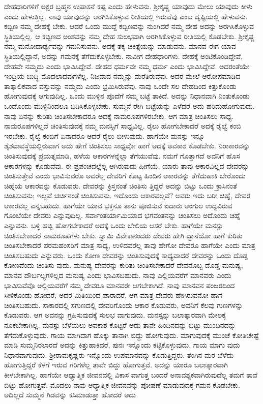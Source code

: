 ದೇಹಧಾರಿಗಳಿಗೆ ಅಕ್ಷರ ಬ್ರಹ್ಮನ ಉಪಾಸನೆ ಕಷ್ಟ ಎಂದು ಹೇಳುವನು. ಶ‍್ರೀಕೃಷ್ಣ ಯಾವುದು ಮೇಲು ಯಾವುದು ಕೀಳು ಎಂದು ಹೇಳುತ್ತಿಲ್ಲ. ನಾವು ಯಾವುದನ್ನು ಅರಗಿಸಿಕೊಳ್ಳುವ ರೀತಿಯಲ್ಲಿ ಇರುವೆವು ಎಂಬ ದೃಷ್ಟಿಯಲ್ಲಿ ಹೇಳುವನು. ಕಬ್ಬಿಣ ನಮ್ಮ ದೇಹಕ್ಕೆ ಬೇಕು. ಆದರೆ ಒಂದು ಮುದ್ದೆ ಕಬ್ಬಿಣವನ್ನು ನುಂಗಿದರೆ ನಮ್ಮ ದೇಹ ಅದನ್ನು ಅರಗಿಸಿಕೊಳ್ಳುವ ಸ್ಥಿತಿಯಲ್ಲಿಲ್ಲ. ಆ ಕಬ್ಬಿಣದ ಅಂಶವನ್ನು ನಮ್ಮ ದೇಹ ಸುಲಭವಾಗಿ ಅರಗಿಸಿಕೊಳ್ಳುವ ರೀತಿಯಲ್ಲಿ ಕೊಡಬೇಕು. ಶ‍್ರೀಕೃಷ್ಣ ನಮ್ಮ ಮನೋದಾರ್ಢ್ಯವನ್ನು ಗಮನಿಸುವನು. ಅದಕ್ಕೆ ತಕ್ಕ ಚಿಕಿತ್ಸೆಯನ್ನು ಮಾಡುವನು. ಮಾನವ ಈಗ ಯಾವ ಸ್ಥಿತಿಯಲ್ಲಿದ್ದಾನೆ, ಅದನ್ನು ಗಮನಕ್ಕೆ ತೆಗೆದುಕೊಳ್ಳಬೇಕು. ನಾವೀಗ ದೇಹಧಾರಿಗಳು. ದೇಹಕ್ಕೆ ಅಂಟಿಕೊಂಡಿದ್ದೇವೆ, ದೇಹವೇ ನಮ್ಮದು ಎಂದು ಭಾವಿಸಿದ್ದೇವೆ. ದೇಹದ ಧರ್ಮವೇ ನಮ್ಮ ಧರ್ಮ ಎಂದು ಭಾವಿಸಿದ್ದೇವೆ. ಅದರಂತೆಯೇ ಇಂದ್ರಿಯ ಬುದ್ಧಿ ಮೊದಲಾದವುಗಳೆಲ್ಲ. ನಿಜವಾದ ನಮ್ಮನ್ನು ಮರೆತಿರುವೆವು. ಅದರ ಮೇಲೆ ಆರೋಪಮಾಡಿದ ತಾತ್ಕಾಲಿಕವಾದ ವಸ್ತುವನ್ನು ನಮ್ಮದು ಎಂದು ಭ್ರಮಿಸಿರುವೆವು. ನಾವು ಒಂದೇ ಸಲ ದೇಹದಿಂದ ಕಿತ್ತುಕೊಂಡು ಹೋಗುವುದಕ್ಕೆ ಆಗುವುದಿಲ್ಲ. ಒಂದು ಮುಳ್ಳಿನ ಪೊದೆಗೆ ನಮ್ಮ ಬಟ್ಟೆ ತಾಕಿದೆ. ಅದನ್ನು ನಿಧಾನವಾಗಿ ನಿಂತುಕೊಂಡು ಒಂದೊಂದು ಮುಳ್ಳಿನಿಂದಲೂ ಬಿಡಿಸಿಕೊಳ್ಳಬೇಕು. ಸುಮ್ಮನೆ ರೇಗಿ ಬಟ್ಟೆಯನ್ನು ಎಳೆದರೆ ಅದು ಹರಿದುಹೋಗುವುದು. ನಾವು ಏನನ್ನು ಕುರಿತು ಚಿಂತಿಸಬೇಕಾದರೂ ಅದಕ್ಕೆ ನಾಮರೂಪಗಳಿರಬೇಕು. ಆಗ ಮಾತ್ರ ಚಿಂತಿಸಲು ಸಾಧ್ಯ. ನಾಮರೂಪಗಳಿಲ್ಲದೆ ಚಿಂತಿಸುವುದಕ್ಕೆ ನಮ್ಮ ಮನಸ್ಸಿಗೆ ಸಾಧ್ಯವಿಲ್ಲ. ರೈಲು ಹೋಗಬೇಕಾದರೆ ಅದಕ್ಕೆ ರೈಲ್ವೆ ಕಂಬಿ ಇರಬೇಕು. ರೈಲ್ವೆ ಕಂಬಿಗೆ ಏನಾದರೂ ಆದರೆ ರೈಲು ಬೀಳುವುದು. ಹಾಗೆಯೇ ಮನಸ್ಸು ಇನ್ನೂ ಶೈಶವಾವಸ್ಥೆಯಲ್ಲಿರುವಾಗ ಅದು ಹೇಗೆ ಚಿಂತಿಸಲು ಸಾಧ್ಯವೋ ಹಾಗೆ ಅದಕ್ಕೆ ಅವಕಾಶ ಕೊಡಬೇಕು. ನಿರಾಕಾರವನ್ನು ಚಿಂತಿಸುವುದಕ್ಕೆ ಪ್ರಯತ್ನಮಾಡಿ, ಹಳೆಯ ಆಕಾರಗಳನ್ನೆಲ್ಲಾ ತೆಗೆಯುವೆವು. ನಮಗೆ ಗೊತ್ತಾಗದೆ ಅವನಿಗೆ ಹೊಸ ಆಕಾರಗಳನ್ನು ಕೊಡುವೆವು. ಈ ಪ್ರಪಂಚದಲ್ಲೆಲ್ಲ ಆಗಿರುವುದು ಹೀಗೆಯೆ. ಯಾರು ತಾವು ಆಕಾರವಿಲ್ಲದ ದೇವರನ್ನು ಚಿಂತಿಸುತ್ತೇವೆ ಎಂದು ಭಾವಿಸುವರೊ ಅವರೆಲ್ಲ ದೇವರಿಗೆ ಕೊಟ್ಟ ಹಿಂದಿನ ಆಕಾರವನ್ನು ತೆಗೆದುಹಾಕಿ ಬೇರೊಂದು ಚಿಹ್ನೆಯ ಆಕಾರವನ್ನು ಕೊಡುವರು. ದೇವರನ್ನು ಕ್ರಿಸ್ತನಂತೆ ಚಿಂತಿಸು ತ್ತಿದ್ದರೆ ಅದನ್ನು ಬಿಟ್ಟು ಒಂದು ಕ್ರಾಸಿನಂತೆ ಚಿಂತಿಸುವನು; ಇಲ್ಲವೆ ಚರ್ಚಿನಂತೆ ಚಿಂತಿಸುವನು. ಇದೊಂದು ಆಕಾರವಲ್ಲವೆ? ಅವರು ಇದು ಬರೀ ಚಿಹ್ನೆ, ದೇವರ ಆಕಾರವಲ್ಲ ಎನ್ನಬಹುದು. ಹಾಗೆಯೇ ಯಾವ ಭಕ್ತನೂ ತಾನು ಪೂಜಿಸುವ ಐದಾರು ಅಂಗುಲ ಉದ್ದವಿರುವ ಗೊಂಬೆಯೇ ದೇವರು ಎನ್ನುವುದಿಲ್ಲ. ಸರ್ವಾಂತರ್ಯಾಮಿಯಾದ ಭಗವಂತನನ್ನು ಚಿಂತಿಸಲು ಅದೊಂದು ಚಿಹ್ನೆ ಎನ್ನುವನು. ಬಳ್ಳಿ ಹಬ್ಬಿ ಹೋಗಬೇಕಾದರೆ ಅದಕ್ಕೆ ಒಂದು ಬೇಲಿಯ ಆಸರೆ ಬೇಕು. ಹಾಗೆಯೇ ಮನಸ್ಸು ಚಿಂತಿಸಬೇಕಾದರೆ ನಾಮರೂಪಗಳು ಬೇಕು. ಸ್ವಾಮಿ ವಿವೇಕಾನಂದರು ದೇವರು ಹೇಗಿ ದ್ದಾನೆಯೋ ಹಾಗೆ ಕುರಿತು ಚಿಂತಿಸಬೇಕಾದರೆ ಪರಮಹಂಸರಿಗೆ ಮಾತ್ರ ಸಾಧ್ಯ, ಉಳಿದವರೆಲ್ಲ ತಾವು ಹೇಗೋ ದೇವರೂ ಹಾಗೆಯೇ ಎಂದು ಮಾತ್ರ ಚಿಂತಿಸಬಹುದು ಎನ್ನುವರು. ಒಂದು ಕೋಣ ದೇವರನ್ನು ಚಿಂತಿಸುವುದಕ್ಕೆ ಸಾಧ್ಯವಾದರೆ ದೇವರನ್ನು ಒಂದು ದೊಡ್ಡ ಕೋಣವೆಂದು ಚಿಂತಿಸು ವುದು. ಮನುಷ್ಯ ದೇವರನ್ನು ಕುರಿತು ಚಿಂತಿಸಬೇಕಾದರೆ ದೇವನೊಬ್ಬ ದೊಡ್ಡ ಮನುಷ್ಯ, ಮಾನವ ದೌರ್ಬಲ್ಯಗಳಿಲ್ಲದ ಮನುಷ್ಯ ಎಂದು ಭಾವಿಸಬಹುದು. ನಾವು ಎಲ್ಲಿಯವರೆಗೆ ಮಾನವರು ಎಂದು ಭಾವಿಸುವೆವೊ ಅಲ್ಲಿಯವರೆಗೆ ನಮ್ಮ ದೇವರೂ ಮಾನವರೇ ಆಗಬೇಕಾಗಿದೆ. ನಾವು ಮಾನವನ ಪಂಜರದಿಂದ ಸೀಳಿಕೊಂಡು ಹೋದರೆ, ಅದರ ಮಿತಿಯಿಂದ ಪಾರಾದರೆ, ಆಗ ಮಾತ್ರ ದೇವರು ಹೇಗಿರುವನೋ ಹಾಗೆ ಚಿಂತಿಸಬಹುದು. ಸಾಕಾರದಲ್ಲಿ ಸಗುಣದಲ್ಲಿ ದೇವರಿಗೊಂದು ಆಕಾರ ಕೊಡುವರು, ಅವನಿಗೆ ಕೆಲವು ಗುಣಗಳನ್ನು ಕೊಡುವರು. ಆಗ ಅವನನ್ನು ಗ್ರಹಿಸುವುದಕ್ಕೆ ಸುಲಭ ವಾಗುವುದು. ಮನಸ್ಸನ್ನು ಬಲಾತ್ಕಾರವಾಗಿ ಮೇಲಕ್ಕೆ ನೂಕಬೇಕಾಗಿಲ್ಲ. ಮನಸ್ಸು ಬೆಳೆಯಲು ಅವಕಾಶ ಕೊಟ್ಟರೆ ಅದು ತಾನೇ ಹಿಂದಿನದನ್ನು ಬಿಟ್ಟು ಮುಂದಿನದನ್ನು ತೆಗೆದುಕೊಳ್ಳುವುದು. ಗಾಯ ಮಾಗಿದಾಗ ಹೊಕ್ಕು ತಾನಾಗಿ ಬಿದ್ದು ಹೋಗುವುದು. ಮಾಗುವುದಕ್ಕೆ ಮುಂಚೆ ಕೋತಿಚೇಷ್ಟೆ ಮಾಡಿ ಸುಮ್ಮನಿರಲಾರದೆ ಅದನ್ನು ಕಿತ್ತುಹಾಕಿದರೆ, ಪುನಃ ಇನ್ನೊಂದು ಕಟ್ಟಿಕೊಳ್ಳುವುದು. ಗಾಯ ಮಾಗು ವುದು ನಿಧಾನವಾಗುವುದು. ಶ‍್ರೀರಾಮಕೃಷ್ಣರು ಇನ್ನೊಂದು ಉಪಮಾನವನ್ನು ಕೊಡುತ್ತಿದ್ದರು. ತೆಂಗಿನ ಮರ ಬೆಳೆದು ಹೋಗುತ್ತಿದ್ದರೆ ಕೆಳಗೆ ಇರುವ ಗರಿಗಳೆಲ್ಲ ತಾವೇ ಬಿದ್ದು ಹೋಗುತ್ತವೆ. ಅದನ್ನು ಯಾರೂ ಬಲಾತ್ಕಾರವಾಗಿ ಕೀಳಬೇಕಾಗಿಲ್ಲ. ಹಾಗೆಯೇ ಆಧ್ಯಾತ್ಮಿಕ ಜೀವನದಲ್ಲಿ ವಿಕಾಸ ವಾಗುತ್ತ ಬಂದರೆ ಅನಾವಶ್ಯಕವಾಗಿರುವುದೆಲ್ಲ ತಮಗೆ ತಾವೆ ಬಿಟ್ಟು ಹೋಗುತ್ತವೆ. ಮೊದಲು ನಾವು ಆಧ್ಯಾತ್ಮಿಕ ಜೀವನವನ್ನು ಪೋಷಣೆ ಮಾಡುವುದಕ್ಕೆ ಗಮನ ಕೊಡಬೇಕು. ಅದಿಲ್ಲದೆ ಸುಮ್ಮನೆ ಗಿಡವನ್ನು ಕಸಿಮಾಡುತ್ತಾ ಹೋದರೆ ಅದು 